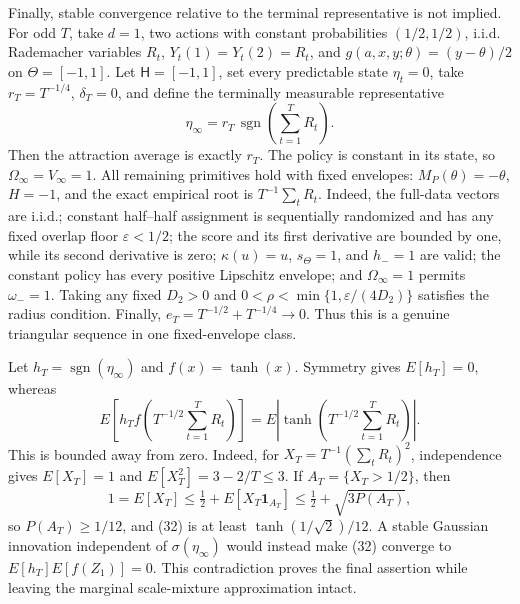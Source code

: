 Finally, stable convergence relative to the terminal representative is not implied. For odd \(T\), take \(d=1\), two actions with constant probabilities \((1/2,1/2)\), i.i.d. Rademacher variables \(R_t\), \(Y_t(1)=Y_t(2)=R_t\), and \(g(a,x,y;\theta)=(y-\theta)/2\) on \(\Theta=[-1,1]\). Let \(\mathsf H=[-1,1]\), set every predictable state \(\eta_t=0\), take \(r_T=T^{-1/4}\), \(\delta_T=0\), and define the terminally measurable representative
\[
 \eta_\infty=r_T\,\operatorname{sgn}\left(\sum_{t=1}^TR_t\right). \tag{31}
\]
Then the attraction average is exactly \(r_T\). The policy is constant in its state, so \(\Omega_\infty=V_\infty=1\). All remaining primitives hold with fixed envelopes: \(M_P(\theta)=-\theta\), \(H=-1\), and the exact empirical root is \(T^{-1}\sum_tR_t\).
Indeed, the full-data vectors are i.i.d.; constant half--half assignment is sequentially randomized and has any fixed overlap floor \(\varepsilon<1/2\); the score and its first derivative are bounded by one, while its second derivative is zero; \(\kappa(u)=u\), \(s_\Theta=1\), and \(h_-=1\) are valid; the constant policy has every positive Lipschitz envelope; and \(\Omega_\infty=1\) permits \(\omega_-=1\). Taking any fixed \(D_2>0\) and \(0<\rho<\min\{1,\varepsilon/(4D_2)\}\) satisfies the radius condition. Finally, \(e_T=T^{-1/2}+T^{-1/4}\to0\). Thus this is a genuine triangular sequence in one fixed-envelope class.

Let \(h_T=\operatorname{sgn}(\eta_\infty)\) and \(f(x)=\tanh(x)\). Symmetry gives \(E[h_T]=0\), whereas
\[
 E\left[h_Tf\left(T^{-1/2}\sum_{t=1}^TR_t\right)\right]
 =E\left|\tanh\left(T^{-1/2}\sum_{t=1}^TR_t\right)\right|. \tag{32}
\]
This is bounded away from zero. Indeed, for \(X_T=T^{-1}(\sum_tR_t)^2\), independence gives \(E[X_T]=1\) and \(E[X_T^2]=3-2/T\le3\). If \(A_T=\{X_T>1/2\}\), then
\[
 1=E[X_T]\le\tfrac12+E[X_T\mathbf1_{A_T}]
 \le\tfrac12+\sqrt{3P(A_T)},
\]
so \(P(A_T)\ge1/12\), and (32) is at least \(\tanh(1/\sqrt2)/12\). A stable Gaussian innovation independent of \(\sigma(\eta_\infty)\) would instead make (32) converge to \(E[h_T]E[f(Z_1)]=0\). This contradiction proves the final assertion while leaving the marginal scale-mixture approximation intact.